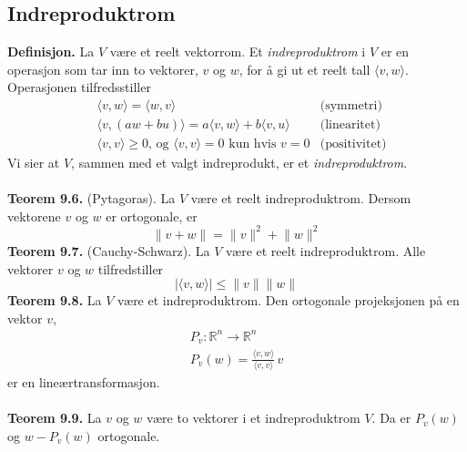 \documentclass{article}
\begin{document}
\subsection{Indreproduktrom}
\textbf{Definisjon.} La $V$ være et reelt vektorrom. Et \textit{indreproduktrom} i $V$ er en operasjon som tar inn to vektorer, $v$ og $w$, for å gi ut et reelt tall $\langle v, w \rangle$. Operasjonen tilfredsstiller
\begin{align*}
    &\langle v, w \rangle = \langle w, v \rangle &\text{(symmetri)} \\
    &\langle v, (aw + bu) \rangle = a \langle v, w \rangle + b \langle v, u \rangle &\text{(linearitet)} \\
    &\langle v, v \rangle \geq 0 \text{, og } \langle v, v \rangle = 0 \text{ kun hvis } v = 0 &\text{(positivitet)}
\end{align*}
Vi sier at $V$, sammen med et valgt indreprodukt, er et \textit{indreproduktrom}.
\\\\
\textbf{Teorem 9.6.} (Pytagoras). La $V$ være et reelt indreproduktrom. Dersom vektorene $v$ og $w$ er ortogonale, er
\[ \lVert v + w \rVert = \lVert v \rVert^2 + \lVert w \rVert^2 \]
\textbf{Teorem 9.7.} (Cauchy-Schwarz). La $V$ være et reelt indreproduktrom. Alle vektorer $v$ og $w$ tilfredstiller
\[| \langle v, w \rangle | \leq \lVert v \rVert \lVert w \rVert \]
\textbf{Teorem 9.8.} La $V$ være et indreproduktrom. Den ortogonale projeksjonen på en vektor $v$,
\begin{gather*}
    P_v : \mathbb{R}^n \rightarrow \mathbb{R}^n \\
    P_v(w)=\frac{\langle v, w \rangle}{\langle v, v \rangle}\,v
\end{gather*}
er en lineærtransformasjon.
\\\\
\textbf{Teorem 9.9.} La $v$ og $w$ være to vektorer i et indreproduktrom $V$. Da er $P_v(w)$ og $w-P_v(w)$ ortogonale.
\end{document}
